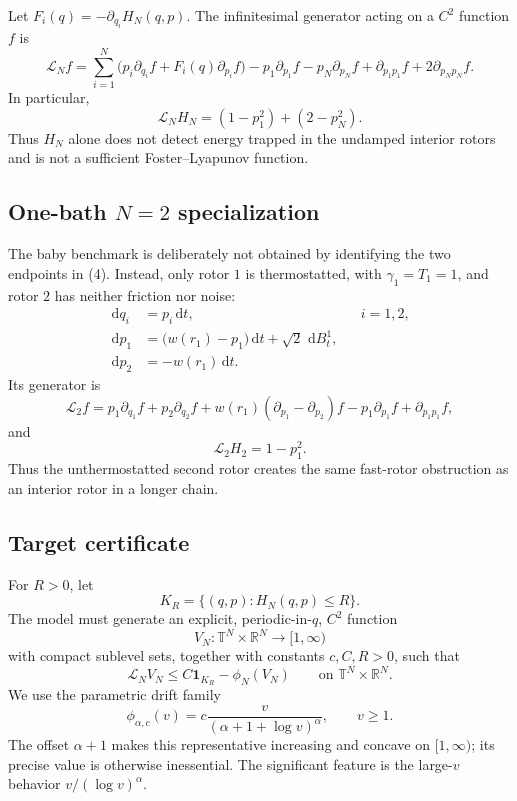 \documentclass[11pt]{article}
\newcommand{\T}{\mathbb{T}}
\newcommand{\R}{\mathbb{R}}
\newcommand{\1}{\mathbf{1}}
\newcommand{\cL}{\mathcal{L}}
\newcommand{\dd}{\,\mathrm{d}}
\begin{document}
Let $F_i(q)=-\partial_{q_i}H_N(q,p)$. The infinitesimal generator acting on a $C^2$ function $f$ is
\begin{equation}
\cL_Nf=\sum_{i=1}^{N}\bigl(p_i\partial_{q_i}f+F_i(q)\partial_{p_i}f\bigr)
-p_1\partial_{p_1}f-p_N\partial_{p_N}f
+\partial_{p_1p_1}f+2\partial_{p_Np_N}f.
\end{equation}
In particular,
\begin{equation}
\cL_NH_N=(1-p_1^2)+(2-p_N^2).
\end{equation}
Thus $H_N$ alone does not detect energy trapped in the undamped interior rotors and is not a sufficient Foster--Lyapunov function.

\subsection{One-bath $N=2$ specialization}
The baby benchmark is deliberately not obtained by identifying the two endpoints in (4). Instead, only rotor $1$ is thermostatted, with $\gamma_1=T_1=1$, and rotor $2$ has neither friction nor noise:
\begin{subequations}
\begin{align}
\dd q_i&=p_i\dd t, &&i=1,2,\\
\dd p_1&=\bigl(w(r_1)-p_1\bigr)\dd t+\sqrt2\,\dd B_t^1,\\
\dd p_2&=-w(r_1)\dd t.
\end{align}
\end{subequations}
Its generator is
\begin{equation}
\cL_2f=p_1\partial_{q_1}f+p_2\partial_{q_2}f
+w(r_1)(\partial_{p_1}-\partial_{p_2})f
-p_1\partial_{p_1}f+\partial_{p_1p_1}f,
\end{equation}
and
\begin{equation}
\cL_2H_2=1-p_1^2.
\end{equation}
Thus the unthermostatted second rotor creates the same fast-rotor obstruction as an interior rotor in a longer chain.

\subsection{Target certificate}
For $R>0$, let
\[
K_R=\{(q,p):H_N(q,p)\le R\}.
\]
The model must generate an explicit, periodic-in-$q$, $C^2$ function
\[
V_N:\T^N\times\R^N\longrightarrow[1,\infty)
\]
with compact sublevel sets, together with constants $c,C,R>0$, such that
\begin{equation}
\cL_NV_N\le C\1_{K_R}-\phi_N(V_N)
\qquad\text{on }\T^N\times\R^N.
\end{equation}
We use the parametric drift family
\begin{equation}
\phi_{\alpha,c}(v)=c\frac{v}{(\alpha+1+\log v)^\alpha},
\qquad v\ge1.
\end{equation}
The offset $\alpha+1$ makes this representative increasing and concave on $[1,\infty)$; its precise value is otherwise inessential. The significant feature is the large-$v$ behavior $v/(\log v)^\alpha$.
\end{document}
